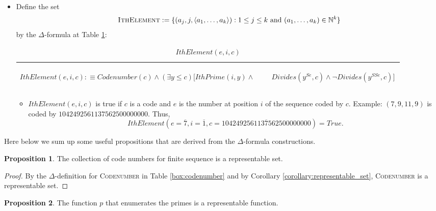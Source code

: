 \documentclass[11pt,letterpaper]{book}
\theoremstyle{definition}
\newtheorem{proposition}{Proposition}[section]
\begin{document}
\begin{itemize}
{\begin{table}[h]
\end{table}
}
\item{Define the set
$$ \text{\textsc{IthElement}} : = \{ (a_j, j, \langle a_1, \ldots, a_k \rangle)  : 1 \leq j \leq k \text{ and } (a_1, \ldots, a_k) \in \mathbb{N}^k \} $$
by the $\Delta$-formula at Table \ref{box:ith_element}:
\begin{table}[h]
\caption{$IthElement(e, i, c)$}
\label{box:ith_element}
\begin{tabular}{|p{0.9\linewidth}|}
\hline
\rule{0pt}{3ex}
\begin{center}
$IthElement(e, i, c) : \equiv Codenumber(c) \land (\exists y \leq c) \bigg[ IthPrime(i, y) \land$
$\quad \quad Divides(y^{Se}, c) \land \lnot Divides(y^{SSe}, c) \bigg] $
\end{center} \\
\hline
\end{tabular}

\end{table}

}
\begin{itemize}
\item{$IthElement(e, i, c)$ is true if $c$ is a code and $e$ is the number at
position $i$ of the sequence coded by $c$. Example: $(7, 9, 11, 9)$ is
coded by $1042492561137562500000000$. Thus, $$IthElement(e=\overline{7}, i=\overline{1},
c=\overline{1042492561137562500000000}) = True . $$}
\end{itemize}

\end{itemize}

Here below we sum up some useful propositions that are derived from the $\Delta
$-formula constructions.

\begin{proposition}\label{proposition:code_number_representable}
The collection of code numbers for finite sequence is a
representable set.
\end{proposition}

\begin{proof}
By the $\Delta$-definition for \textsc{Codenumber} in Table \ref{box:codenumber} and by Corollary \ref{corollary:representable_set}, \textsc{Codenumber} is a representable set.

\end{proof}


\begin{proposition}
The function $p$ that enumerates the primes is a representable function.
\end{proposition}
\end{document}

